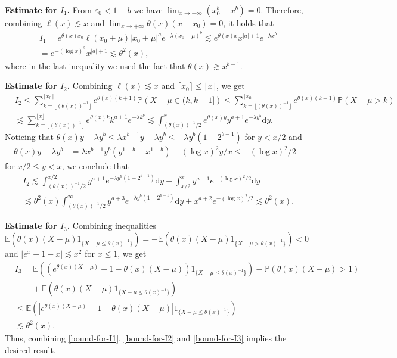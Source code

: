 \documentclass[10pt,a4paper]{amsart}
\numberwithin{equation}{section}
\begin{document}
\noindent
{\bf Estimate for $I_1$.} From $\varepsilon_0< 1-b$ we have  $\lim_{x\to+\infty} (x_0^b - x^b )=  0$. Therefore, 
 combining $\ell(x)\lesssim x$ and $\lim_{x\to+\infty} \theta(x)(x-x_0)=  0$, it holds that 
\begin{align}\label{bound-for-I1}
	&I_1 = e^{\theta(x)x_0}\ell(x_0+\mu) |x_0+\mu|^a e^{-\lambda (x_0+\mu)^b}\lesssim e^{\theta(x)x} x^{|a|+1}e^{-\lambda x^b}\nonumber\\
	& = e^{-(\log x)^2} x^{|a|+1}\lesssim \theta^2(x),
\end{align}
where in the last inequality we used the fact that $\theta(x)\gtrsim x^{b-1}$.

\noindent
{\bf Estimate for $I_2$.} Combining $\ell(x)\lesssim x$ and $\lceil x_0 \rceil \leq \lfloor x\rfloor$, we get
\begin{align}
	& I_2 \leq \sum_{k= \lfloor (\theta(x))^{-1}\rfloor }^{\lceil x_0\rceil} e^{\theta(x)(k+1)} \mathbb{P}\left( X-\mu\in (k,k+1]\right)\leq \sum_{k= \lfloor (\theta(x))^{-1}\rfloor}^{\lceil x_0\rceil} e^{\theta(x)(k+1)} \mathbb{P}\left( X-\mu >k\right)\nonumber\\
	&\lesssim \sum_{k= \lfloor (\theta(x))^{-1}\rfloor}^{ \lfloor x\rfloor} e^{\theta(x)k} k^{a+1} e^{-\lambda k^b} \lesssim \int_{(\theta(x))^{-1}/2}^{x} e^{\theta(x) y} y^{a+1}e^{-\lambda y^b} \mathrm{d}y. 
\end{align}
Noticing that $\theta (x)y -\lambda y^b\leq  \lambda x^{b-1}y -\lambda y^b \leq -\lambda y^b(1-2^{b-1})$ for $y<x/2$ and 
\begin{align}
\theta (x)y -\lambda y^b & =  \lambda x^{b-1}y^b(y^{1-b}-x^{1-b})  - (\log x)^2 y/x  \leq - (\log x)^2 /2
\end{align}
for $x/2\leq y<x$,   we conclude that 
\begin{align}\label{bound-for-I2}
	& I_2 \lesssim \int_{(\theta(x))^{-1}/2}^{x/2}  y^{a+1}e^{-\lambda y^b(1-2^{b-1})} \mathrm{d}y  +\int_{x/2}^{x}  y^{a+1}e^{-(\log x)^2/2 } \mathrm{d}y\nonumber\\
	&\lesssim \theta^2(x)\int_{(\theta(x))^{-1}/2}^{\infty}  y^{a+3}e^{-\lambda y^b(1-2^{b-1})} \mathrm{d}y  + x^{a+2}e^{-(\log x)^2/2 } \lesssim \theta^2(x).
\end{align}

\noindent
{\bf Estimate for $I_3$.} Combining inequalities 
\[
\mathbb{E}\left(\theta(x)(X-\mu)1_{\{X-\mu\leq \theta(x)^{-1}\}}\right)=-\mathbb{E}\left(\theta(x)(X-\mu)1_{\{X-\mu> \theta(x)^{-1}\}}\right) <0
\]
and  $|e^{x}-1-x|\lesssim x^2$ for $x\leq 1$, we get 
\begin{align}\label{bound-for-I3}
	& I_3 = \mathbb{E}\left(\left(e^{\theta(x)(X-\mu)} -1-\theta(x)(X-\mu)\right)1_{\{X-\mu \leq \theta(x)^{-1}\}}\right)-\mathbb{P}(\theta(x)(X-\mu)>1)\nonumber\\
	&\qquad + \mathbb{E}\left(\theta(x)(X-\mu)1_{\{X-\mu\leq \theta(x)^{-1}\}}\right)\nonumber\\
	&\leq \mathbb{E}\left(\left|e^{\theta(x)(X-\mu)} -1-\theta(x)(X-\mu)\right|1_{\{X-\mu \leq \theta(x)^{-1}\}}\right)\nonumber\\
	&\lesssim \theta^2(x) .
\end{align}
Thus, combining \eqref{bound-for-I1}, \eqref{bound-for-I2} and \eqref{bound-for-I3} implies the desired result. 
\end{document}
